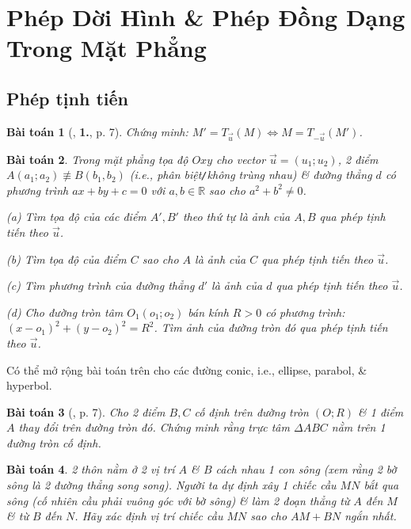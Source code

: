 \documentclass{article}
\numberwithin{equation}{section}
\newtheorem{baitoan}{Bài toán}[section]
\begin{document}

\section{Phép Dời Hình \& Phép Đồng Dạng Trong Mặt Phẳng}

\subsection{Phép tịnh tiến}

\begin{baitoan}[\cite{SGK_Toan_11_dai_so_giai_tich_co_ban}, \textbf{1.}, p. 7]
	\label{prob:phep tinh tien}
	Chứng minh: $M' = T_{\vec{u}}(M)\Leftrightarrow M = T_{-\vec{u}}(M')$.
\end{baitoan}

\begin{baitoan}
	Trong mặt phẳng tọa độ $Oxy$ cho vector $\vec{u} = (u_1;u_2)$, 2 điểm $A(a_1;a_2)\not\equiv B(b_1,b_2)$ (i.e., phân biệt\emph{\texttt{/}}không trùng nhau) \& đường thẳng $d$ có phương trình $ax + by + c = 0$ với $a,b\in\mathbb{R}$ sao cho $a^2 + b^2\ne 0$.
	\begin{enumerate*}
		\item[(a)] Tìm tọa độ của các điểm $A',B'$ theo thứ tự là ảnh của $A,B$ qua phép tịnh tiến theo $\vec{u}$.
		\item[(b)] Tìm tọa độ của điểm $C$ sao cho $A$ là ảnh của $C$ qua phép tịnh tiến theo $\vec{u}$.
		\item[(c)] Tìm phương trình của đường thẳng $d'$  là ảnh của $d$ qua phép tịnh tiến theo $\vec{u}$.
		\item[(d)] Cho đường tròn tâm $O_1(o_1;o_2)$ bán kính $R > 0$ có phương trình: $(x - o_1)^2 + (y - o_2)^2 = R^2$. Tìm ảnh của đường tròn đó qua phép tịnh tiến theo $\vec{u}$.
	\end{enumerate*}
\end{baitoan}
Có thể mở rộng bài toán trên cho các đường conic, i.e., ellipse, parabol, \& hyperbol.

\begin{baitoan}[\cite{SGK_Toan_11_hinh_hoc_nang_cao}, p. 7]
	Cho 2 điểm $B,C$ cố định trên đường tròn $(O;R)$ \& 1 điểm $A$ thay đổi trên đường tròn đó. Chứng minh rằng trực tâm $\Delta ABC$ nằm trên 1 đường tròn cố định.
\end{baitoan}

\begin{baitoan}
	2 thôn nằm ở 2 vị trí $A$ \& $B$ cách nhau 1 con sông (xem rằng 2 bờ sông là 2 đường thẳng song song). Người ta dự định xây 1 chiếc cầu $MN$ bắt qua sông (cố nhiên cầu phải vuông góc với bờ sông) \& làm 2 đoạn thẳng từ $A$ đến $M$ \& từ $B$ đến $N$. Hãy xác định vị trí chiếc cầu $MN$ sao cho $AM + BN$ ngắn nhất.
\end{baitoan}
\end{document}
